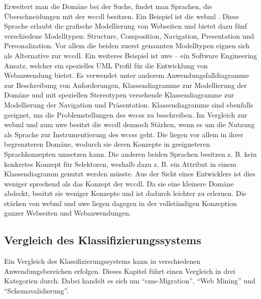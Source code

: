         Erweitert man die Domäne bei der Suche, findet man Sprachen,
        die Überschneidungen mit der \gls{wccdl} besitzen.
        Ein Beispiel ist die \gls{webml} \cite{ceri:webML}.
        Diese Sprache erlaubt die grafische Modellierung von Webseiten
        und bietet dazu fünf verschiedene Modelltypen:
        Structure, Composition, Navigation, Presentation und Personalization.
        Vor allem die beiden zuerst genannten Modelltypen eignen sich
        als Alternative zur \gls{wccdl}.
        Ein weiteres Beispiel ist \gls{uwe} \cite{koch:uwe} --
        ein Software Engineering Ansatz,
        welcher ein spezielles UML Profil für die Entwicklung von Webanwendung bietet.
        Es verwendet unter anderem Anwendungsfalldiagramme zur Beschreibung von Anforderungen,
        Klassendiagramme zur Modellierung der Domäne
        und mit speziellen Stereotypen versehende Klassendiagramme zur Modellierung der Navigation
        und Präsentation.
        Klassendiagramme sind ebenfalls geeignet, um die Problemstellungen des \glspl{wccs} zu beschreiben.
        Im Vergleich zur \gls{webml} und zum \gls{uwe} besitzt die \gls{wccdl} dennoch Stärken,
        wenn es um die Nutzung als Sprache zur Instrumentierung des \glspl{wccs} geht.
        Die liegen vor allem in ihrer begrenzteren Domäne,
        wodurch sie deren Konzepte in geeigneteren Sprachkonzepten umsetzen kann.
        Die anderen beiden Sprachen besitzen z. B. kein konkretes Konzept für
        Selektoren, weshalb dazu z. B. ein Attribut in einem Klassendiagramm genutzt werden müsste.
        Aus der Sicht eines Entwicklers ist dies weniger sprechend als das Konzept der \gls{wccdl}.
        Da sie eine kleinere Domäne abdeckt, besitzt sie weniger Konzepte
        und ist dadurch leichter zu erlernen.
        Die stärken von \gls{webml} und \gls{uwe} liegen dagegen in der vollständigen Konzeption
        ganzer Webseiten und Webanwendungen.
    
    \subsection{Vergleich des Klassifizierungssystems}
        \label{section:discussionComparisonClassificationSystem}
        Ein Vergleich des Klassifizierungssystems kann in verschiedenen Anwendungsbereichen erfolgen.
        Dieses Kapitel führt einen Vergleich in drei Kategorien durch.
        Dabei handelt es sich um "`\gls{cms}-Migration"', "`Web Mining"'
        und "`Schemavalidierung"'.

